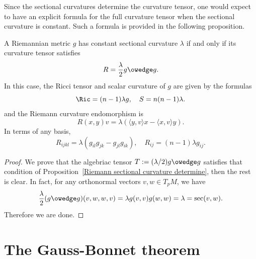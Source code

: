 Since the sectional curvatures determine the curvature tensor, one would expect to have an explicit formula for the full curvature tensor when the sectional curvature is 
constant. Such a formula is provided in the following proposition.
\begin{proposition}\label{Riemann constant curvature iff}
A Riemannian metric $g$ has constant sectional curvature $\lambda$ if and only if its curvature tensor satisfies
\[R=\frac{\lambda}{2}g\owedge g.\]
In this case, the Ricci tensor and scalar curvature of $g$ are given by the formulas
\[\Ric=(n-1)\lambda g,\quad S=n(n-1)\lambda.\]
and the Riemann curvature endomorphism is
\[R(x,y)v=\lambda(\langle y,v\rangle x-\langle x,v\rangle y).\]
In terms of any basis,
\[R_{ijkl}=\lambda(g_{il}g_{jk}-g_{jl}g_{ik}),\quad R_{ij}=(n-1)\lambda g_{ij}.\]
\end{proposition}
\begin{proof}
We prove that the algebriac tensor $T:=(\lambda/2)g\owedge g$ satisfies that condition of Proposition~\ref{Riemann sectional curvature determine}, then the rest is clear. 
In fact, for any orthonormal vectors $v,w\in T_pM$, we have
\[\frac{\lambda}{2}(g\owedge g)(v,w,w,v)=\lambda g(v,v)g(w,w)=\lambda=\sec(v,w).\]
Therefore we are done.
\end{proof}
\section{The Gauss-Bonnet theorem}
